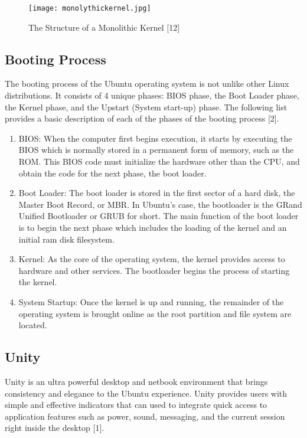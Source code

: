 \documentclass[11pt]{article}
\newcommand{\forceindent}{\leavevmode{\parindent=1em\indent}}
\begin{document}
\begin{figure}[h!]
  \centering
    \caption{The Structure of a Monolithic Kernel [12]}
{\texttt{[image: monolythickernel.jpg]}}
\end{figure}
\subsection{Booting Process}
\forceindent The booting process of the Ubuntu operating system is not unlike other Linux distributions. It consists of 4 unique phases: BIOS phase, the Boot Loader phase, the Kernel phase, and the Upstart (System start-up) phase. The following list provides a basic description of each of the phases of the booting process [2].
\begin{enumerate}
\item BIOS: When the computer first begins execution, it starts by executing the BIOS which is normally stored in a permanent form of memory, such as the ROM. This BIOS code must initialize the hardware other than the CPU, and obtain the code for the next phase, the boot loader. 
\item Boot Loader: The boot loader is stored in the first sector of a hard disk, the Master Boot Record, or MBR. In Ubuntu's case, the bootloader is the GRand Unified Bootloader or GRUB for short. The main function of the boot loader is to begin the next phase which includes the loading of the kernel and an initial ram disk filesystem.
\item Kernel: As the core of the operating system, the kernel provides access to hardware and other services. The bootloader begins the process of starting the kernel.
\item System Startup: Once the kernel is up and running, the remainder of the operating system is brought online as the root partition and file system are located. 
\end{enumerate}
\subsection{Unity}
\forceindent Unity is an ultra powerful desktop and netbook environment that brings consistency and elegance to the Ubuntu experience. Unity provides users with simple and effective indicators that can used to integrate quick access to application features such as power, sound, messaging, and the current session right inside the desktop [1].
\end{document}

